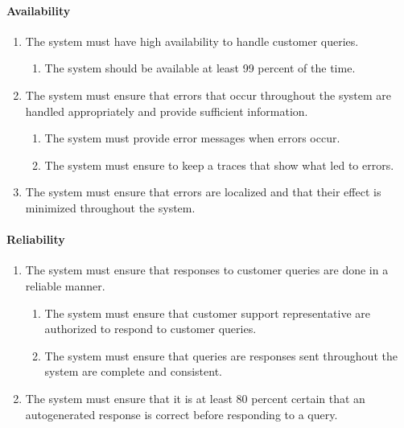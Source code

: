 \documentclass[11pt]{article}
\begin{document}
\paragraph{Availability}
\begin{enumerate}[label=R1.\arabic*.]
	\item The system must have high availability to handle customer queries.
	\begin{enumerate}[label*=\arabic*.]
		\item The system should be available at least 99 percent of the time.
	\end{enumerate}
	\item The system must ensure that errors that occur throughout the system are handled appropriately and provide sufficient
information.
	\begin{enumerate}[label*=\arabic*.]
		\item The system must provide error messages when errors occur.
		\item The system must ensure to keep a traces that show what led to errors.
	\end{enumerate}
	\item The system must ensure that errors are localized and that their effect is minimized throughout the system.
\end{enumerate}

\paragraph{Reliability}
\begin{enumerate}[label=R1.\arabic*.]
	\item The system must ensure that responses to customer queries are done in a reliable manner.
	\begin{enumerate}[label*=\arabic*.]
		\item The system must ensure that customer support representative are authorized to respond to customer queries.
		\item The system must ensure that queries are responses sent throughout the system are complete and consistent.
	\end{enumerate}
	\item The system must ensure that it is at least 80 percent certain that an autogenerated response is correct before responding to a query.
\end{enumerate}
\end{document}
